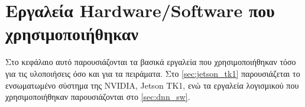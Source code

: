 \chapter{Εργαλεία Hardware/Software που χρησιμοποιήθηκαν}
\label{chapter:tools}

Στο κεφάλαιο αυτό παρουσιάζονται τα βασικά εργαλεία που
χρησιμοποιήθηκαν τόσο για τις υλοποιήσεις όσο και για τα πειράματα.
Στο \autoref{sec:jetson_tk1} παρουσιάζεται το ενσωματωμένο σύστημα
της NVIDIA, Jetson TK1, ενώ τα εργαλεία λογισμικού που χρησιμοποιήθηκαν
παρουσιάζονται στο \autoref{sec:dnn_sw}.




